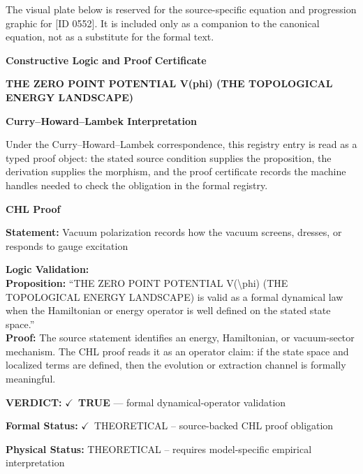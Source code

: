 \begingroup\footnotesize\sloppy
The visual plate below is reserved for the source-specific equation and progression graphic for [ID 0552]. It is included only as a companion to the canonical equation, not as a substitute for the formal text.
\par\endgroup
\ifTZPDarkEdition
{}
\fi

\clearpage
\begingroup\tzpsupportsetup
\noindent\textbf{\fontsize{10.8pt}{12.8pt}\selectfont [ID 0552] Constructive Logic and Proof Certificate}\par
\noindent\textbf{\fontsize{10pt}{12pt}\selectfont THE ZERO POINT POTENTIAL V(phi) (THE TOPOLOGICAL ENERGY LANDSCAPE)}\par
\vspace{0.45em}
\begingroup
\footnotesize
\setlength{\parskip}{0.22em}
\setlength{\parindent}{0pt}
\noindent\textbf{Curry--Howard--Lambek Interpretation}\par
Under the Curry--Howard--Lambek correspondence, this registry entry is read as a typed proof
object: the stated source condition supplies the proposition, the derivation supplies the
morphism, and the proof certificate records the machine handles needed to check the obligation
in the formal registry.

\vspace{0.45em}
\noindent\textbf{CHL Proof}\par
\textbf{Statement:} Vacuum polarization records how the vacuum screens, dresses, or responds to gauge
excitation

\textbf{Logic Validation:}\\
\textbf{Proposition:} ``THE ZERO POINT POTENTIAL V(\textbackslash{}phi) (THE TOPOLOGICAL ENERGY LANDSCAPE) is valid as a
formal dynamical law when the Hamiltonian or energy operator is well defined on the
stated state space.''\\
\textbf{Proof:} The source statement identifies an energy, Hamiltonian, or vacuum-sector mechanism. The
CHL proof reads it as an operator claim: if the state space and localized terms are
defined, then the evolution or extraction channel is formally meaningful.

\textbf{VERDICT:} \ensuremath{\checkmark}\ \textbf{TRUE} --- formal dynamical-operator validation

\textbf{Formal Status:} \ensuremath{\checkmark}\ THEORETICAL -- source-backed CHL proof obligation

\textbf{Physical Status:} THEORETICAL -- requires model-specific empirical interpretation
\par\vspace{0.45em}
\par
\ifTZPDarkEdition
{}
\fi
\endgroup
\endgroup
